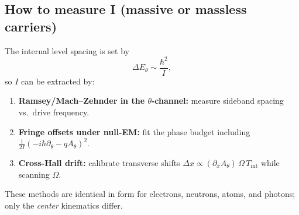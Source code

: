 \subsection{How to measure I (massive or massless carriers)}
The internal level spacing is set by
\begin{equation}
\Delta E_\theta\sim \frac{\hbar^2}{I},
\end{equation}
so $I$ can be extracted by:
\begin{enumerate}
\item \textbf{Ramsey/Mach--Zehnder in the $\theta$-channel:} measure sideband spacing vs.\ drive frequency.
\item \textbf{Fringe offsets under null-EM:} fit the phase budget including $\tfrac{1}{2I}(-i\hbar\partial_\theta-qA_\theta)^2$.
\item \textbf{Cross-Hall drift:} calibrate transverse shifts $\Delta x\propto (\partial_xA_\theta)\,\Omega\,T_\text{int}$ while scanning $\Omega$.
\end{enumerate}
These methods are identical in form for electrons, neutrons, atoms, and photons; only the \emph{center}
kinematics differ.
